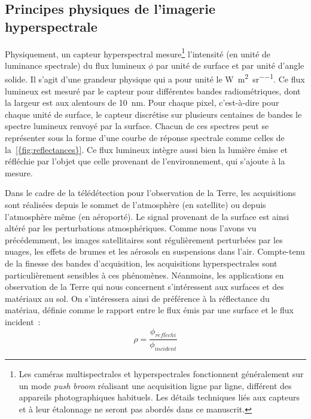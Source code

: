 \subsection{Principes physiques de l'imagerie hyperspectrale}

Physiquement, un capteur hyperspectral mesure\footnote{Les caméras multispectrales et hyperspectrales fonctionnent généralement sur un mode \emph{push broom} réalisant une acquisition ligne par ligne, différent des appareils photographiques habituels. Les détails techniques liés aux capteurs et à leur étalonnage ne seront pas abordés dans ce manuscrit.} l'intensité (en unité de luminance spectrale) du flux lumineux $\phi$ par unité de surface et par unité d'angle solide. Il s'agit d'une grandeur physique qui a pour unité le \si{\watt\per\square\meter\per\steradian}. Ce flux lumineux est mesuré par le capteur pour différentes bandes radiométriques, dont la largeur est aux alentours de \SI{10}{\nano\meter}. Pour chaque pixel, c'est-à-dire pour chaque unité de surface, le capteur discrétise sur plusieurs centaines de bandes le spectre lumineux renvoyé par la surface. Chacun de ces spectres peut se représenter sous la forme d'une courbe de réponse spectrale comme celles de la~\cref{{fig:reflectances}}. Ce flux lumineux intègre aussi bien la lumière émise et réfléchie par l'objet que celle provenant de l'environnement, qui s'ajoute à la mesure.

Dans le cadre de la télédétection pour l'observation de la Terre, les acquisitions sont réalisées depuis le sommet de l'atmosphère (en satellite) ou depuis l'atmosphère même (en aéroporté). Le signal provenant de la surface est ainsi altéré par les perturbations atmosphériques. Comme nous l'avons vu précédemment, les images satellitaires sont régulièrement perturbées par les nuages, les effets de brumes et les aérosols en suspensions dans l'air. Compte-tenu de la finesse des bandes d'acquisition, les acquisitions hyperspectrales sont particulièrement sensibles à ces phénomènes. Néanmoins, les applications en observation de la Terre qui nous concernent s'intéressent aux surfaces et des matériaux au sol. On s'intéressera ainsi de préférence à la réflectance du matériau, définie comme le rapport entre le flux émis par une surface et le flux incident~:
\begin{equation}
  \rho = \frac{\phi_{\mathit{r\acute{e}fl\acute{e}chi}}}{\phi_\mathit{incident}}
\end{equation}

